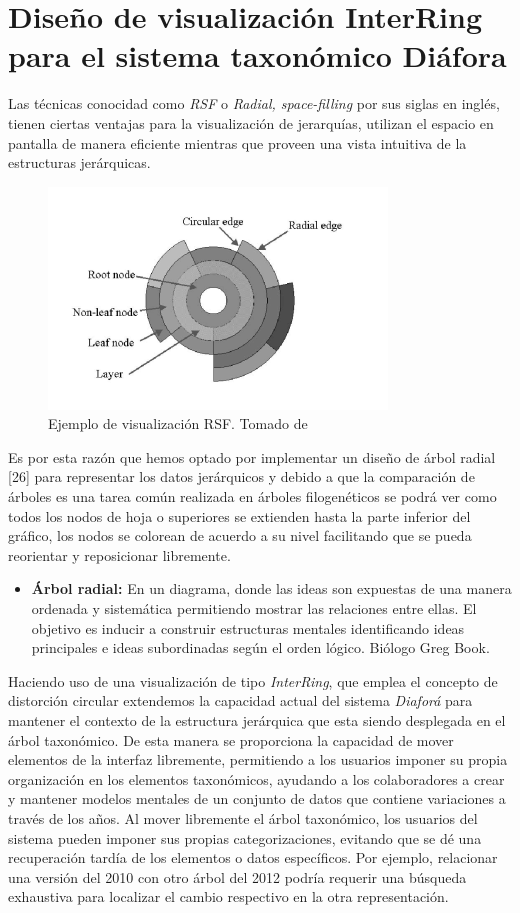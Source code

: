 \documentclass[journal]{IEEEtran}
\begin{document}
\section{Diseño de visualización InterRing para el sistema taxonómico Diáfora}
Las técnicas conocidad como \emph{RSF} o \emph{Radial, space-filling} por sus siglas en inglés,
 tienen ciertas ventajas
para la visualización de jerarquías, utilizan el espacio en pantalla de manera eficiente mientras que proveen una vista intuitiva 
de la estructuras jerárquicas.
\begin{figure}[]
  \centering
  \includegraphics[scale=0.6]{interring}
  \caption{Ejemplo de visualización RSF. Tomado  de \cite{yang_ward_rundensteiner}}
\end{figure}

Es por esta razón que hemos optado por implementar un diseño de árbol radial [26] para representar los datos jerárquicos y debido a que la comparación de árboles es una tarea común realizada en árboles filogenéticos se podrá ver como todos los nodos de hoja o superiores se extienden hasta la parte inferior del gráfico, 
los nodos se colorean de acuerdo a su nivel facilitando que se pueda reorientar y reposicionar libremente. 


\begin{itemize}
  \item \textbf{Árbol radial:} En un diagrama, donde las ideas son expuestas de una manera ordenada y sistemática permitiendo mostrar las relaciones entre ellas. 
  El objetivo es inducir a construir estructuras mentales identificando ideas principales e ideas subordinadas según el orden lógico. Biólogo Greg Book.
\end{itemize}


Haciendo uso de una visualización de tipo \emph{InterRing}\cite{yang_ward_rundensteiner}, que emplea
el concepto de distorción circular extendemos la capacidad actual del sistema \emph{Diaforá} para mantener el contexto
de la estructura jerárquica que esta siendo desplegada en el árbol taxonómico. De esta manera se proporciona la capacidad de mover elementos de la interfaz libremente, permitiendo a los usuarios imponer su propia organización en los elementos taxonómicos, ayudando a los colaboradores a crear y mantener modelos mentales de un conjunto de datos que contiene variaciones a través de los años. 
Al mover libremente el árbol taxonómico, los usuarios del sistema pueden imponer sus propias categorizaciones, evitando que se dé una recuperación tardía de los elementos o datos específicos. Por ejemplo, relacionar una versión del 2010 con otro árbol del 2012 podría requerir una búsqueda exhaustiva para localizar el cambio respectivo en la otra representación. 
\end{document}
